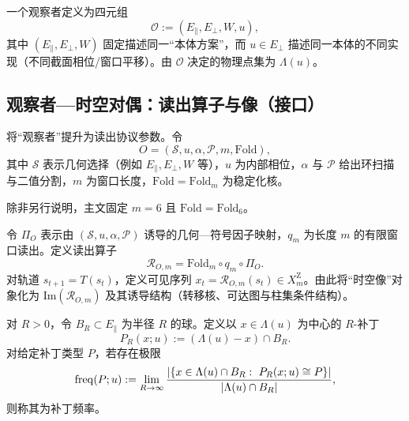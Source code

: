 \begin{definition}[观察者作为实现参数]\label{def:observer}
一个观察者定义为四元组
\[
\mathcal{O}:=(E_{\parallel},E_{\perp},W,u),
\]
其中 $(E_{\parallel},E_{\perp},W)$ 固定描述同一“本体方案”，而 $u\in E_{\perp}$ 描述同一本体的不同实现（不同截面相位/窗口平移）。由 $\mathcal{O}$ 决定的物理点集为 $\Lambda(u)$。
\end{definition}

\subsection{观察者—时空对偶：读出算子与像（接口）}

将“观察者”提升为读出协议参数。令
$$
O=(\mathcal{S},u,\alpha,\mathcal{P},m,\mathrm{Fold}),
$$
其中 $\mathcal{S}$ 表示几何选择（例如 $E_{\parallel},E_{\perp},W$ 等），$u$ 为内部相位，$\alpha$ 与 $\mathcal{P}$ 给出环扫描与二值分割，$m$ 为窗口长度，$\mathrm{Fold}=\mathrm{Fold}_m$ 为稳定化核。

\begin{assumption}[主文固定带宽]\label{assump:m6-fixed-main-chain}
除非另行说明，主文固定 $m=6$ 且 $\mathrm{Fold}=\mathrm{Fold}_6$。
\end{assumption}

令 $\Pi_O$ 表示由 $(\mathcal{S},u,\alpha,\mathcal{P})$ 诱导的几何—符号因子映射，$q_m$ 为长度 $m$ 的有限窗口读出。定义读出算子
$$
\mathcal{R}_{O,m}=\mathrm{Fold}_m\circ q_m\circ \Pi_O.
$$
对轨道 $s_{t+1}=T(s_t)$，定义可见序列 $x_t=\mathcal{R}_{O,m}(s_t)\in X_m^{\mathrm Z}$。由此将“时空像”对象化为 $\mathrm{Im}(\mathcal{R}_{O,m})$ 及其诱导结构（转移核、可达图与柱集条件结构）。

\begin{definition}[局部补丁与补丁频率]\label{def:patch-frequency}
对 $R>0$，令 $B_R\subset E_{\parallel}$ 为半径 $R$ 的球。定义以 $x\in\Lambda(u)$ 为中心的 $R$-补丁
\[
P_R(x;u):=(\Lambda(u)-x)\cap B_R.
\]
对给定补丁类型 $P$，若存在极限
\[
\mathrm{freq}(P;u):=\lim_{R\to\infty}\frac{\left\lvert \{x\in\Lambda(u)\cap B_R:\ P_R(x;u)\cong P\}\right\rvert}{\left\lvert \Lambda(u)\cap B_R\right\rvert},
\]
则称其为补丁频率。
\end{definition}

